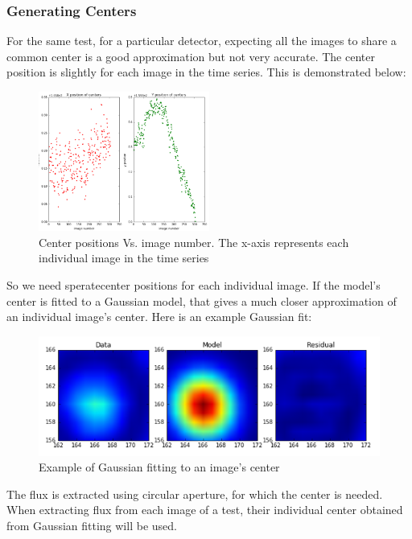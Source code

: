 \documentclass{aastex6}
\begin{document}
        \subsubsection{Generating Centers}
        For the same test, for a particular detector, expecting all the images to share a common center is a good approximation but not very accurate. The center position is slightly for each image in the time series. This is demonstrated below:
        
        \begin{figure}[H]
            \begin{centering}
            \includegraphics[width=0.5\textwidth]{center_positions}
            \caption{Center positions Vs. image number. The x-axis represents each individual image in the time series}
            \end{centering}
        \end{figure}
        
        So we need speratecenter positions for each individual image. If the model's center is fitted to a Gaussian model, that gives a much closer approximation of an individual image's center. Here is an example Gaussian fit:
        
        \begin{figure}[H]
            \begin{centering}
                \includegraphics[scale=0.5]{Gaussian}
                \caption{Example of Gaussian fitting to an image's center}
            \end{centering}
        \end{figure}
        The flux is extracted using circular aperture, for which the center is needed. When extracting flux from each image of a test, their individual center obtained from Gaussian fitting will be used.  
        
\end{document}
